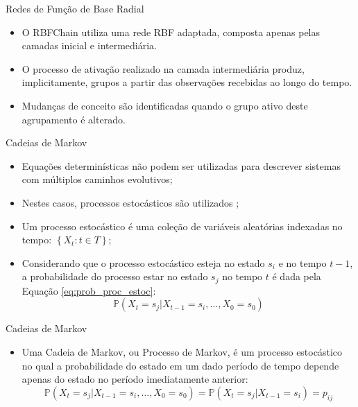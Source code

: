 \documentclass[10pt]{beamer}
\begin{document}
\begin{frame}{Redes de Função de Base Radial}
    \begin{itemize}
        \item<1 -> O RBFChain utiliza uma rede RBF adaptada, composta apenas pelas camadas inicial e intermediária.
        \item<2 -> O processo de ativação realizado na camada intermediária produz, implicitamente, grupos a partir das observações recebidas ao longo do tempo.
        \item<3 -> Mudanças de conceito são identificadas quando o grupo ativo deste agrupamento é alterado.
      \end{itemize}
\end{frame}


\begin{frame}{Cadeias de Markov}
    \begin{itemize}
        \item<1 -> Equações determinísticas não podem ser utilizadas para descrever sistemas com múltiplos caminhos evolutivos;
        \item<1 -> Nestes casos, \alert{processos estocásticos} são utilizados \cite{taylor1998introduction};
        \item<1 -> Um \alert{processo estocástico} é uma coleção de variáveis aleatórias indexadas no tempo: $\left\{ X _ { t } : t \in T \right\}$;
        \item<1 -> Considerando que o processo estocástico esteja no estado $s_i$ e no tempo $t - 1$, a probabilidade
        do processo estar no estado $s_j$ no tempo $t$ é dada pela Equação \ref{eq:prob_proc_estoc}:
        \begin{equation}
            \label{eq:prob_proc_estoc}
            \mathbb { P } \left( X _ { t } = s _ { j } | X _ { t - 1 } = s _ { i } , \ldots , X _ { 0 } = s _ { 0 } \right)
        \end{equation}
      \end{itemize}
\end{frame}

\begin{frame}{Cadeias de Markov}
    \begin{itemize}
        \item<1 -> Uma \alert{Cadeia de Markov}, ou \alert{Processo de Markov}, é um processo estocástico no qual a probabilidade do estado em um dado período de tempo depende apenas do estado no período imediatamente anterior:
        \begin{equation}
            \label{eq:markov}
            \mathbb { P } \left( X _ { t } = s _ { j } | X _ { t - 1 } = s _ { i } , \ldots , X _ { 0 } = s _ { 0 } \right) = \mathbb { P } \left( X _ { t } = s _ { j } | X _ { t - 1 } = s _ { i } \right) = p _ { i j }
        \end{equation}
      \end{itemize}
\end{frame}
\end{document}
